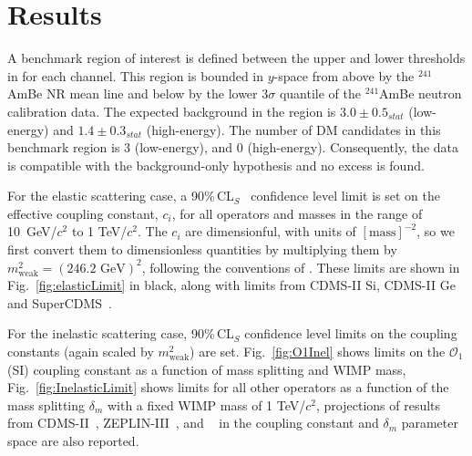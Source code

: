 \section{Results}
\label{sec:Results}

A benchmark region of interest is defined between the upper and lower thresholds in \cSi{} for each channel. This region
is bounded in $y$-space from above by the $^{241}$AmBe NR mean line and below by the lower 3$\sigma$ quantile of the $^{241}$AmBe neutron calibration data. The expected background in the region is $3.0 \pm 0.5_{stat}$ (low-energy) and $1.4 \pm 0.3_{stat}$ (high-energy). The number of DM candidates in this benchmark region is 3 (low-energy), and 0 (high-energy). Consequently, the data is compatible with the background-only hypothesis and no excess is found. 

For the elastic scattering case, a 90\%\,CL$_S$~\cite{cls} confidence level limit is set on the effective coupling constant, $c_i$,  for all operators and masses in the range of 10~GeV/$c^2$ to 1 TeV/$c^2$. The $c_i$ are dimensionful, with units of $[\mathrm{mass}]^{-2}$, so we first convert them to dimensionless quantities by multiplying them by $m_\mathrm{weak}^2=(246.2\text{ GeV})^2$, following the conventions of \cite{Anand:MathTools}. 
These limits are shown in Fig.~\ref{fig:elasticLimit} in black, along with limits from CDMS-II Si, CDMS-II Ge and SuperCDMS~\cite{CDMSEFT}.  


For the inelastic scattering case,  90\%\,CL$_S$ confidence level limits on the coupling constants 
(again scaled by $m_\mathrm{weak}^2$) are set. Fig.~\ref{fig:O1Inel} shows limits on the $\mathcal{O}_1$ (SI) coupling constant as a function of mass splitting and WIMP mass, Fig.~\ref{fig:InelasticLimit} shows limits for all other operators as a function of the mass splitting $\delta_m$ with a fixed WIMP mass of 1 TeV/$c^2$,  
projections of results from CDMS-II~\cite{CDMS_Inelastic}, ZEPLIN-III~\cite{Zepplin_Inel}, and \Xehund~\cite{XENON_Inelastic_WIMP} in the coupling constant and $\delta_m$ parameter space are also reported.
  

